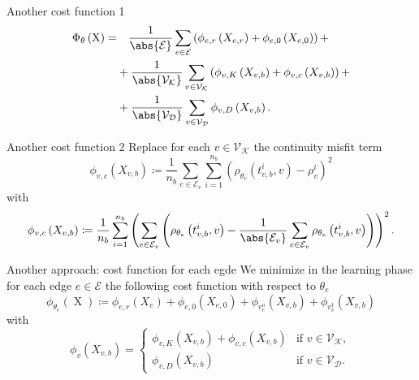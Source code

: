 \documentclass[9pt]{beamer}
\begin{document}
\begin{frame}{Another cost function 1}
    \begin{equation*}
        \begin{aligned} 
            \Phi_{\theta} \left( \operatorname{X} \right)  = & \quad \frac{1}{\abs{\mathcal{E}}} \sum_{e \in \mathcal{E}}  \left(  \phi_{e,r}  \left( X_{e,r} \right) + \phi_{e,0}  \left( X_{e,0} \right)  \right) + \\
            & + \frac{1}{\abs{\mathcal{V}_\mathcal{K}}} \sum_{v \in \mathcal{V}_\mathcal{K}}  \left(  \phi_{v,K}  \left( X_{v,b} \right) + \phi_{v,c} \left( X_{v,b} \right)  \right) + \\
            & + \frac{1}{\abs{\mathcal{V}_\mathcal{D}}} \sum_{v \in \mathcal{V}_\mathcal{D}} \phi_{v,D} \left( X_{v,b} \right).
        \end{aligned}
    \end{equation*}
\end{frame}



\begin{frame}{Another cost function 2}
    Replace for each $v \in \mathcal{V}_{\mathcal{K}}$ the continuity misfit term
    \begin{equation*} 
        \phi_{v,c}  \left( X_{v,b} \right) \coloneqq \frac{1}{n_b} \sum_{e \in \mathcal{E}_v} \sum_{i=1}^{n_b} \left(  \rho_{\theta_e}  \left( t_{v,b}^i, v \right) - \rho_{v}^i \right)^2
    \end{equation*}
    with
    \begin{equation*} 
        \phi_{v,c}  \left( X_{v,b} \right) \coloneqq \frac{1}{n_b}  \sum_{i=1}^{n_b} \left( \sum_{e \in \mathcal{E}_v} \left( \rho_{\theta_e}  \left( t_{v,b}^i, v \right) - \frac{1}{\abs{\mathcal{E}_v}} \sum_{e \in \mathcal{E}_v} \rho_{\theta_e}  \left( t_{v,b}^i, v \right) \right) \right)^2.
    \end{equation*}
\end{frame}



\begin{frame}{Another approach: cost function for each egde}
    We minimize in the learning phase for each edge $e \in \mathcal{E}$ the following cost function with respect to $\theta_e$
    \begin{equation*}
        \phi_{\theta_e} \left( \operatorname{X} \right) \coloneqq \phi_{e,r}  \left( X_e \right) + \phi_{e,0}  \left( X_{e,0} \right) + \phi_{v^{\operatorname{o}}_e}(X_{v,b}) + \phi_{v^{\operatorname{t}}_e}(X_{v,b})
    \end{equation*}
    with 
    \begin{equation*}
        \phi_{v}(X_{v,b}) = \begin{cases} \phi_{v,K}  \left( X_{v,b} \right) +  \phi_{v,c}  \left( X_{v,b} \right)& \text{if } v \in \mathcal{V}_{\mathcal{K}}, \\ \phi_{v,D}  \left( X_{v,b} \right) & \text{if } v \in \mathcal{V}_{\mathcal{D}}. \end{cases}
    \end{equation*}
\end{frame}
\end{document}
